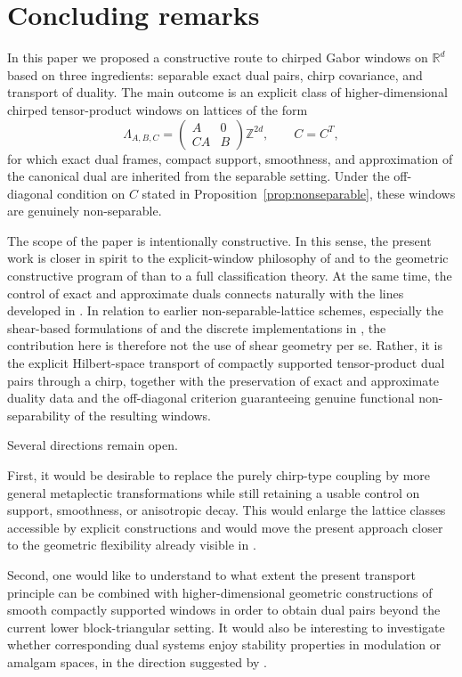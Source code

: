 \documentclass[final,1p,times,authoryear]{elsarticle}
\theoremstyle{definition}
\newcommand{\R}{\mathbb{R}}
\newcommand{\Z}{\mathbb{Z}}
\newcommand{\1}{\mathbf{1}}
\begin{document}
\section{Concluding remarks}

{In this paper we proposed a constructive route to chirped Gabor windows on $\R^d$ based on three ingredients:
separable exact dual pairs, chirp covariance, and transport of duality. The main outcome is an explicit class
of higher-dimensional chirped tensor-product windows on lattices of the form
$$
\Lambda_{A,B,C}
=
\begin{pmatrix}
A&0\\
CA&B
\end{pmatrix}\Z^{2d},
\qquad C=C^T,
$$
for which exact dual frames, compact support, smoothness, and approximation of the canonical dual are inherited
from the separable setting. Under the off-diagonal condition on $C$ stated in
Proposition~\ref{prop:nonseparable}, these windows are genuinely non-separable.}

The scope of the paper is intentionally constructive. In this sense, the present work is closer in spirit to the explicit-window philosophy of \citep{DGM86} and to the geometric constructive program of \citep{PRW12} than to a full classification theory. At the same time, the control of exact and approximate duals connects naturally with the lines developed in \citep{Sto22,CJKK18}. In relation to earlier non-separable-lattice schemes, especially the shear-based formulations
of \citet{VanLeestBastiaans2000} and the discrete implementations in
\citep{VanLeest1999,VanLeestBastiaans2004}, the contribution here is therefore not the
use of shear geometry per se. Rather, it is the explicit Hilbert-space transport of compactly
supported tensor-product dual pairs through a chirp, together with the preservation of
exact and approximate duality data and the off-diagonal criterion guaranteeing genuine
functional non-separability of the resulting windows.

Several directions remain open.

First, it would be desirable to replace the purely chirp-type coupling by more general metaplectic transformations while still retaining a usable control on support, smoothness, or anisotropic decay. This would enlarge the lattice classes accessible by explicit constructions and would move the present approach closer to the geometric flexibility already visible in \citep{PRW12}.

Second, one would like to understand to what extent the present transport principle can be combined with higher-dimensional geometric constructions of smooth compactly supported windows in order to obtain dual pairs beyond the current lower block-triangular setting. It would also be interesting to investigate whether corresponding dual systems enjoy stability properties in modulation or amalgam spaces, in the direction suggested by \citep{BCKOR13}.
\end{document}
